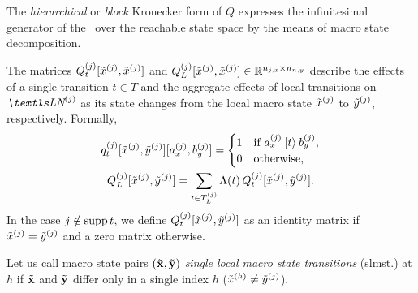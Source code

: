 The \emph{hierarchical} or \emph{block} Kronecker form of $Q$
expresses the infinitesimal generator of the \CTMC\ over the reachable
state space by the means of macro state decomposition.

The matrices $Q_t^{(j)}[\tilde{x}^{(j)}, \tilde{x}^{(j)}]$
and $Q_L^{(j)}[\tilde{x}^{(j)}, \tilde{x}^{(j)}] \in
\mathbb{R}^{n_{j,x} \times n_{n, y}}$ describe
the effects of a single transition $t \in T$ and the aggregate effects of
local transitions on $\LN{j}$ as its state changes from the local
macro state $\tilde{x}^{(j)}$ to $\tilde{y}^{(j)}$,
respectively. Formally,
\begin{gather}
  q_t^{(j)}[\tilde{x}^{(j)},
  \tilde{y}^{(j)}][a_x^{(j)}, b_y^{(j)}] = \begin{cases}
    1 & \text{if $a_x^{(j)} \mathbin{[t\rangle} b_y^{(j)}$,} \\
    0 & \text{otherwise,}
  \end{cases} \label{eq:genstor:explicit:block:tran-matrix}\\
  Q_L^{(j)}[\tilde{x}^{(j)}, \tilde{y}^{(j)}] = \sum_{t \in
    T_L^{(j)}} \Lambda(t) \, Q_t^{(j)}[\tilde{x}^{(j)},
  \tilde{y}^{(j)}] \label{eq:genstor:explicit:block:local-matrix} \text.
\end{gather}
In the case $j \notin \operatorname{supp} t$, we define $Q_t^{(j)}[\tilde{x}^{(j)},
\tilde{y}^{(j)}]$ as an identity matrix if $\tilde{x}^{(j)} =
\tilde{y}^{(j)}$ and a zero matrix otherwise.

Let us call macro state pairs $(\tilde{\bm{\mathrm{x}}}, \tilde{\bm{\mathrm{y}}})$
\emph{single local macro state transitions} (slmst.) at $h$ if $\tilde{\bm{\mathrm{x}}}$
and $\tilde{\bm{\mathrm{y}}}$ differ only in a single index $h$
($\tilde{x}^{(h)} \ne \tilde{y}^{(j)}$).

